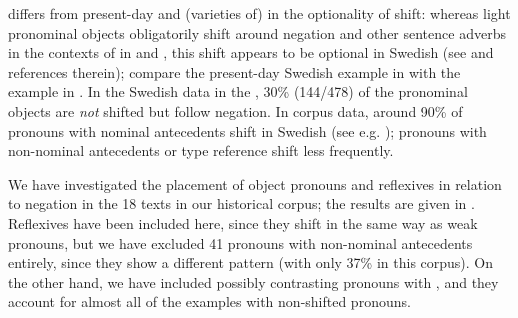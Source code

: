 \documentclass[output=paper]{langscibook}
\begin{document}
 differs from present-day  and (varieties of)  in the optionality of  shift: whereas light pronominal objects obligatorily shift around negation and other sentence adverbs in the contexts of   in  and , this shift appears to be optional in Swedish (see \citealt{Bentzen2014} and references therein); compare the present-day Swedish example in  with the  example in . In the Swedish data in the  \citep{LundquistEtAl2019}, 30\% (144/478) of the pronominal objects are \textit{not} shifted but follow negation. In corpus data, around 90\% of pronouns with nominal antecedents shift in Swedish (see e.g. \citealt{Andreasson2008}); pronouns with non-nominal antecedents or type reference shift less frequently.


\ea\label{ex:lalu:51}

\z
\z


We have investigated the placement of object pronouns and reflexives in relation to negation in the 18 texts in our historical corpus; the results are given in . Reflexives have been included here, since they shift in the same way as weak pronouns, but we have excluded 41 pronouns with non-nominal antecedents entirely, since they show a different pattern (with only 37\%  in this corpus). On the other hand, we have included possibly contrasting pronouns with , and they account for almost all of the examples with non-shifted pronouns.
\end{document}
